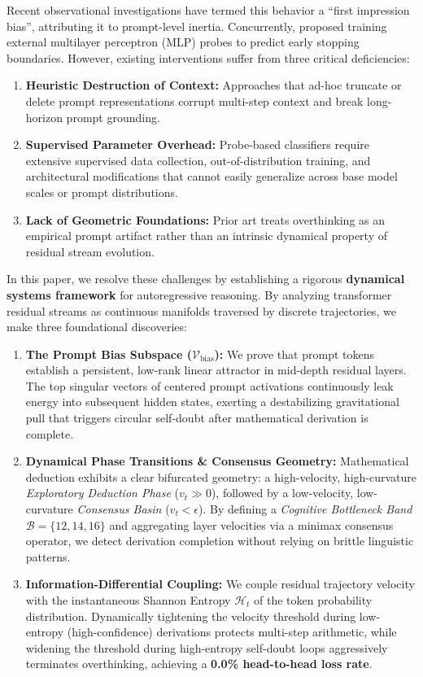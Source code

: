 \documentclass[10pt,twocolumn]{article}
\begin{document}
Recent observational investigations \citep{dang2025firstimpression} have termed this behavior a ``first impression bias'', attributing it to prompt-level inertia. Concurrently, \citet{safo2026rom} proposed training external multilayer perceptron (MLP) probes to predict early stopping boundaries. However, existing interventions suffer from three critical deficiencies:
\begin{enumerate}
    \item \textbf{Heuristic Destruction of Context:} Approaches that ad-hoc truncate or delete prompt representations \citep{dang2025firstimpression} corrupt multi-step context and break long-horizon prompt grounding.
    \item \textbf{Supervised Parameter Overhead:} Probe-based classifiers \citep{safo2026rom} require extensive supervised data collection, out-of-distribution training, and architectural modifications that cannot easily generalize across base model scales or prompt distributions.
    \item \textbf{Lack of Geometric Foundations:} Prior art treats overthinking as an empirical prompt artifact rather than an intrinsic dynamical property of residual stream evolution.
\end{enumerate}

In this paper, we resolve these challenges by establishing a rigorous \textbf{dynamical systems framework} for autoregressive reasoning. By analyzing transformer residual streams as continuous manifolds traversed by discrete trajectories, we make three foundational discoveries:
\begin{enumerate}
    \item \textbf{The Prompt Bias Subspace ($\mathcal{V}_{\text{bias}}$):} We prove that prompt tokens establish a persistent, low-rank linear attractor in mid-depth residual layers. The top singular vectors of centered prompt activations continuously leak energy into subsequent hidden states, exerting a destabilizing gravitational pull that triggers circular self-doubt after mathematical derivation is complete.
    \item \textbf{Dynamical Phase Transitions \& Consensus Geometry:} Mathematical deduction exhibits a clear bifurcated geometry: a high-velocity, high-curvature \emph{Exploratory Deduction Phase} ($v_t \gg 0$), followed by a low-velocity, low-curvature \emph{Consensus Basin} ($v_t < \epsilon$). By defining a \emph{Cognitive Bottleneck Band} $\mathcal{B} = \{12, 14, 16\}$ and aggregating layer velocities via a minimax consensus operator, we detect derivation completion without relying on brittle linguistic patterns.
    \item \textbf{Information-Differential Coupling:} We couple residual trajectory velocity with the instantaneous Shannon Entropy $\mathcal{H}_t$ of the token probability distribution. Dynamically tightening the velocity threshold during low-entropy (high-confidence) derivations protects multi-step arithmetic, while widening the threshold during high-entropy self-doubt loops aggressively terminates overthinking, achieving a \textbf{0.0\% head-to-head loss rate}.
\end{enumerate}
\end{document}
